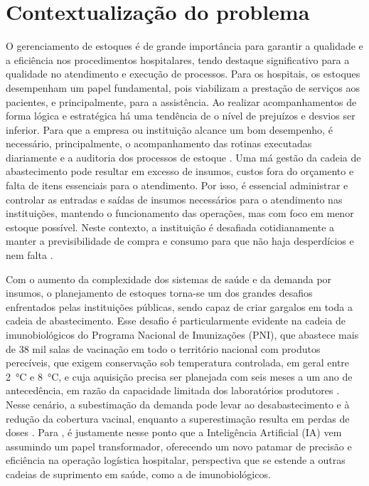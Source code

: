 \documentclass[
    12pt,
    openright,
    oneside,
    a4paper,
    english,
    brazil
]{abntex2}
\begin{document}
\section{Contextualização do problema}
\label{sec:contexto}

O gerenciamento de estoques é de grande importância para garantir a qualidade e a eficiência nos procedimentos hospitalares, tendo destaque significativo para a qualidade no atendimento e execução de processos. Para os hospitais, os estoques desempenham um papel fundamental, pois viabilizam a prestação de serviços aos pacientes, e principalmente, para a assistência. Ao realizar acompanhamentos de forma lógica e estratégica há uma tendência de o nível de prejuízos e desvios ser inferior. Para que a empresa ou instituição alcance um bom desempenho, é necessário, principalmente, o acompanhamento das rotinas executadas diariamente e a auditoria dos processos de estoque . Uma má gestão da cadeia de abastecimento pode resultar em excesso de insumos, custos fora do orçamento e falta de itens essenciais para o atendimento. Por isso, é essencial administrar e controlar as entradas e saídas de insumos necessários para o atendimento nas instituições, mantendo o funcionamento das operações, mas com foco em menor estoque possível. Neste contexto, a instituição é desafiada cotidianamente a manter a previsibilidade de compra e consumo para que não haja desperdícios e nem falta .

Com o aumento da complexidade dos sistemas de saúde e da demanda por insumos, o planejamento de estoques torna-se um dos grandes desafios enfrentados pelas instituições públicas, sendo capaz de criar gargalos em toda a cadeia de abastecimento. Esse desafio é particularmente evidente na cadeia de imunobiológicos do Programa Nacional de Imunizações (PNI), que abastece mais de 38 mil salas de vacinação em todo o território nacional com produtos perecíveis, que exigem conservação sob temperatura controlada, em geral entre 2~°C e 8~°C, e cuja aquisição precisa ser planejada com seis meses a um ano de antecedência, em razão da capacidade limitada dos laboratórios produtores \cite{Lopes2022}. Nesse cenário, a subestimação da demanda pode levar ao desabastecimento e à redução da cobertura vacinal, enquanto a superestimação resulta em perdas de doses \cite{Lopes2022}. Para , é justamente nesse ponto que a Inteligência Artificial (IA) vem assumindo um papel transformador, oferecendo um novo patamar de precisão e eficiência na operação logística hospitalar, perspectiva que se estende a outras cadeias de suprimento em saúde, como a de imunobiológicos.
\end{document}
